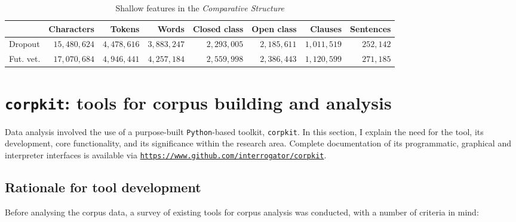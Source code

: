 \begin{table}[htb]
\centering
\footnotesize
\begin{tabular}{lrrrrrrr}

\toprule
{} &  Characters &   Tokens &    Words &  Closed class &  Open class &  Clauses &  Sentences \\
\midrule
Dropout        &    $15,480,624$ &  $4,478,616$ &  $3,883,247$ &  $2,293,005$ &           $2,185,611$ &  $1,011,519$ &     $252,142$ \\
Fut. vet. &    $17,070,684$ &  $4,946,441$ &  $4,257,184$ &  $2,559,998$ &           $2,386,443$ &  $1,120,599$ &     $271,185$ \\
\bottomrule
\end{tabular}
\caption{Shallow features in the \emph{Comparative Structure}}
\label{tab:shallow_C}
\end{table}


\section{\texttt{corpkit}: tools for corpus building and analysis} \label{sect:corpkit}

Data analysis involved the use of a purpose\hyp{}built \texttt{Python}\hyp{}based toolkit, \texttt{corpkit}. In this section, I explain the need for the tool, its development, core functionality, and its significance within the research area. Complete documentation of its programmatic, graphical and interpreter interfaces is available via \texttt{\url{https://www.github.com/interrogator/corpkit}}.

\subsection{Rationale for tool development}

Before analysing the \gls{corpus} data, a survey of existing tools for corpus analysis was conducted, with a number of criteria in mind:

